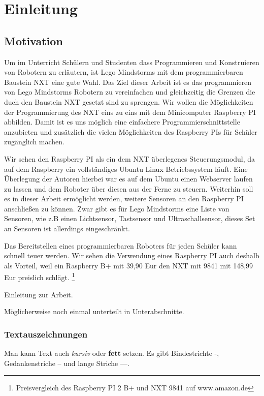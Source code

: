 \chapter{Einleitung}

\section{Motivation}
Um im Unterricht Schülern und Studenten dass Programmieren und Konstruieren von Robotern zu erläutern, ist Lego Mindstorms mit dem programmierbaren Baustein NXT eine gute Wahl. Das Ziel dieser Arbeit ist es das programmieren von Lego Mindstorms Robotern zu vereinfachen und gleichzeitig die Grenzen die duch den Baustein NXT gesetzt sind zu sprengen. Wir wollen die Möglichkeiten der Programmierung des NXT eins zu eins mit dem Minicomputer Raspberry PI abbilden. Damit ist es uns möglich eine einfachere Programmierschnittstelle anzubieten und zusätzlich die vielen Möglichkeiten des Raspberry PIs für Schüler zugänglich machen. 

Wir sehen den Raspberry PI als ein dem NXT überlegenes Steuerungsmodul, da auf dem Raspberry ein vollständiges Ubuntu Linux Betriebssystem läuft. Eine Überlegung der Autoren hierbei war es auf dem Ubuntu einen Webserver laufen zu lassen und dem Roboter über diesen aus der Ferne zu steuern.
Weiterhin soll es in dieser Arbeit ermöglicht werden, weitere Sensoren an den Raspberry PI anschließen zu können. Zwar gibt es für Lego Mindstorms eine Liste von Sensoren, wie z.B einen Lichtsensor, Tastsensor und Ultraschallsensor, dieses Set an Sensoren ist allerdings eingeschränkt.

Das Bereitstellen eines programmierbaren Roboters für jeden Schüler kann schnell teuer werden. Wir sehen die Verwendung eines Raspberry PI auch deshalb als Vorteil, weil ein Raspberry B+ mit 39,90 Eur den NXT mit 9841 mit 148,99 Eur preislich schlägt. \footnote{Preisvergleich des Raspberry PI 2 B+ und NXT 9841 auf www.amazon.de}


Einleitung zur Arbeit.

Möglicherweise noch einmal unterteilt in Unterabschnitte.

\subsection{Textauszeichnungen}
\label{Einleitung:Textauszeichnungen}

Man kann Text auch \textit{kursiv} oder \textbf{fett} setzen. Es gibt Bindestrichte -, Gedankenstriche -- und lange Striche ---.


